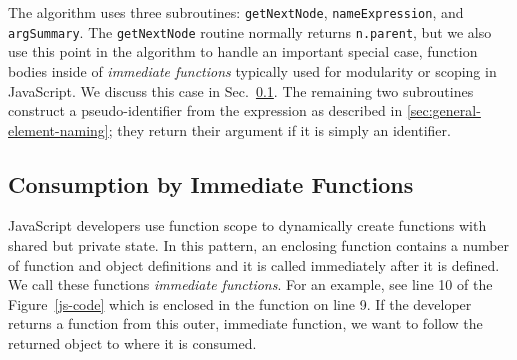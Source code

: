 \documentclass[10pt, preprint]{sigplanconf}
\begin{document}
The algorithm uses three subroutines: \verb|getNextNode|,  \verb|nameExpression|, and \verb|argSummary|. The \verb|getNextNode| routine normally returns \verb|n.parent|, but we also use this point in the algorithm to handle an important special case, function bodies inside of \textit{immediate functions} typically used for modularity or scoping in JavaScript. We discuss this case in Sec.~\ref{sec:immediate}. The remaining two subroutines construct a pseudo-identifier from the expression as described in \ref{sec:general-element-naming}; they return their argument if it is simply an identifier.  




\begin{table}
\centering
{}
\caption{Nodes produce identifiers in the function object consumption summary. Identifiers with a star in the table can be expressions as well as simple identifiers; we explain how we reduce expressions to pseudo-identifier in ~\ref{sec:general-element-naming}.}
\label{table:node-types} 
\end{table}

\subsection{Consumption by Immediate Functions}
\label{sec:immediate}
JavaScript developers use function scope to dynamically create functions with shared but private state. In this pattern, an enclosing function contains a number of function and object definitions and it is called immediately after it is defined. We call these functions \textit{immediate functions}.  For an example, see line 10 of the Figure~\ref{js-code} which is enclosed in the function on line 9. If the developer returns a function from this outer, immediate function, we want to follow the returned object to where it is consumed. 
\end{document}
